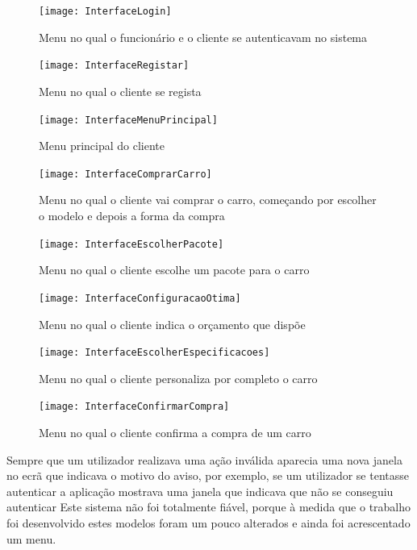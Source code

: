 \documentclass[10pt, a4paper]{article}
\begin{document}
\begin{figure}[!htb]
\centering
\texttt{[image: InterfaceLogin]}
\caption{Menu no qual o funcionário e o cliente se autenticavam no sistema}
\label{Menu L}
\end{figure}

\begin{figure}[!htb]
\centering
\texttt{[image: InterfaceRegistar]}
\caption{Menu no qual o cliente se regista}
\label{Menu R}
\end{figure}

\begin{figure}[!htb]
\centering
\texttt{[image: InterfaceMenuPrincipal]}
\caption{Menu principal do cliente}
\label{Menu CO}
\end{figure}

\begin{figure}[!htb]
\centering
\texttt{[image: InterfaceComprarCarro]}
\caption{Menu no qual o cliente vai comprar o carro, começando por escolher o modelo e depois a forma da compra}
\label{Menu CC}
\end{figure}

\begin{figure}[!htb]
\centering
\texttt{[image: InterfaceEscolherPacote]}
\caption{Menu no qual o cliente escolhe um pacote para o carro}
\label{Menu CO}
\end{figure}

\begin{figure}[!htb]
\centering
\texttt{[image: InterfaceConfiguracaoOtima]}
\caption{Menu no qual o cliente indica o orçamento que dispõe}
\label{Menu CO}
\end{figure}

\begin{figure}[!htb]
\centering
\texttt{[image: InterfaceEscolherEspecificacoes]}
\caption{Menu no qual o cliente personaliza por completo o carro}
\label{Menu EE}
\end{figure}

\begin{figure}[!htb]
\centering
\texttt{[image: InterfaceConfirmarCompra]}
\caption{Menu no qual o cliente confirma a compra de um carro}
\label{Menu CCC}
\end{figure}

\newpage
Sempre que um utilizador realizava uma ação inválida aparecia uma nova janela no ecrã que indicava o motivo do aviso, por exemplo, se um utilizador se tentasse autenticar a aplicação mostrava uma janela que indicava que não se conseguiu autenticar
Este sistema não foi totalmente fiável, porque à medida que o trabalho foi desenvolvido estes modelos foram um pouco alterados e ainda foi acrescentado um menu.
\end{document}
